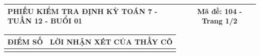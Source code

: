 \documentclass[12pt,a4paper]{article}
\begin{document}
\newpage
\noindent
\begin{tabularx}{\linewidth}{|X|c|}
\hline
\textbf{PHIẾU KIỂM TRA ĐỊNH KỲ TOÁN 7 - TUẦN 12 - BUỔI 01} & \textbf{Mã đề: 104 - Trang 1/2} \\
\hline
\end{tabularx}

\vspace{1.0mm}

\noindent
\begin{tabularx}{\linewidth}{|p{3.2cm}|X|}
\hline
\centering\textbf{ĐIỂM SỐ} & \centering\textbf{LỜI NHẬN XÉT CỦA THẦY CÔ} \tabularnewline
\hline
\rule{0pt}{1.8cm} & \tabularnewline
\hline
\end{tabularx}
\end{document}
